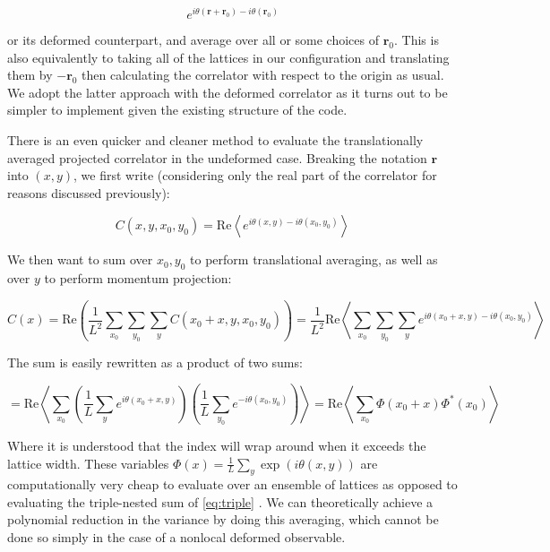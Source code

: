 \documentclass[12pt]{article}
\begin{document}
\begin{equation*}
	e^{i\theta(\mathbf{r}+\mathbf{r}_0)-i\theta(\mathbf{r}_0)}
\end{equation*}

or its deformed counterpart, and average over all or some choices of $\mathbf{r}_0$. This is also equivalently to taking all of the lattices in our configuration and translating them by $-\mathbf{r}_0$
then calculating the correlator with respect to the origin as usual. We adopt the latter approach with the deformed correlator as it turns out to be simpler to implement given
the existing structure of the code. 

There is an even quicker and cleaner method to evaluate the translationally averaged projected correlator in the undeformed case. Breaking the notation $\mathbf{r}$ into $(x, y)$, we first write
(considering only the real part of the correlator for reasons discussed previously):

\begin{equation*}
	C(x,y,x_0,y_0) = \mathrm{Re} \left\langle e^{i\theta(x,y) - i\theta(x_0,y_0)} \right\rangle
\end{equation*}

We then want to sum over $x_0,y_0$ to perform translational averaging, as well as over $y$ to perform momentum projection:

\begin{equation} \label{eq:triple}
	C(x) = \mathrm{Re} \left( \frac{1}{L^2} \sum_{x_0}\sum_{y_0}\sum_{y}C(x_0+x,y,x_0,y_0) \right) = \frac{1}{L^2} \mathrm{Re} \left\langle \sum_{x_0}\sum_{y_0}\sum_{y} e^{i\theta(x_0+x,y) - i\theta(x_0,y_0)} \right\rangle
\end{equation}

The sum is easily rewritten as a product of two sums:

\begin{equation} \label{eq:phis}
	= \mathrm{Re} \left\langle \sum_{x_0} \left( \frac{1}{L}\sum_{y} e^{i\theta(x_0+x,y)} \right) \left( \frac{1}{L}\sum_{y_0} e^{-i\theta(x_0,y_0)} \right)  \right\rangle = \mathrm{Re} \left\langle \sum_{x_0} \Phi(x_0+x)\Phi^*(x_0) \right\rangle
\end{equation}

Where it is understood that the index will wrap around when it exceeds the lattice width. These variables $\Phi(x)=\frac{1}{L}\sum_{y}\exp(i\theta(x,y))$ are computationally very cheap to evaluate over an ensemble of lattices
as opposed to evaluating the triple-nested sum of \ref{eq:triple} .
We can theoretically achieve a polynomial reduction in the variance by doing this averaging, which cannot be done so simply in the case of a nonlocal deformed observable.
\end{document}
